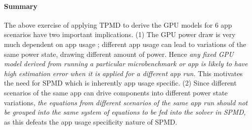 \paragraph{Summary}
The above exercise of applying TPMD to derive the GPU models for 6 app scenarios 
have two important implications.
(1) The GPU power draw is very much dependent on app usage ; different app usage can lead to  variations of the same power state, drawing different amount of 
power. Hence {\it any fixed GPU model derived from
running a particular microbenchmark or app is likely to have high estimation error when 
it is applied for a different app run.} This motivates the need for SPMD which is inherently app usage specific. 
(2) Since different scenarios of the same app can drive components into different
power state variations, {\it the equations from different scenarios of the same app run should not be 
grouped into the same system of equations to be fed into the solver in SPMD,}
as this defeats the app usage specificity nature of SPMD. 
